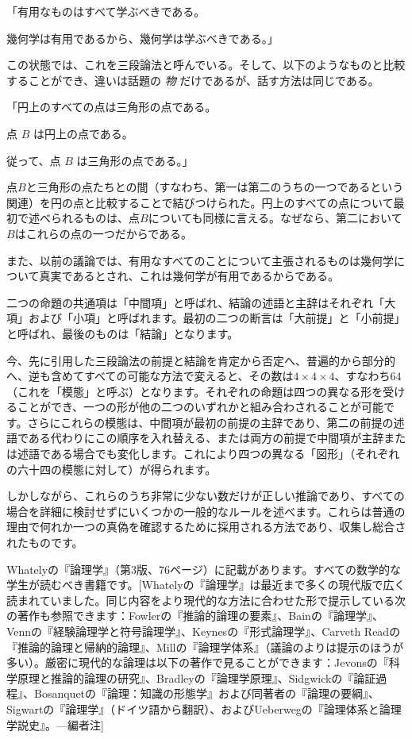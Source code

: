 \documentclass[a4paper,11pt,openany]{ltjsbook}
\begin{document}
「有用なものはすべて学ぶべきである。

幾何学は有用であるから、幾何学は学ぶべきである。」

この状態では、これを三段論法と呼んでいる。そして、以下のようなものと比較することができ、違いは話題の \emph{物} だけであるが、話す方法は同じである。

「円上のすべての点は三角形の点である。

点 $B$ は円上の点である。

従って、点 $B$ は三角形の点である。」

点$B$と三角形の点たちとの間（すなわち、第一は第二のうちの一つであるという関連）を円の点と比較することで結びつけられた。円上のすべての点について最初で述べられるものは、点$B$についても同様に言える。なぜなら、第二において$B$はこれらの点の一つだからである。

また、以前の議論では、有用なすべてのことについて主張されるものは幾何学について真実であるとされ、これは幾何学が有用であるからである。

二つの命題の共通項は「中間項」と呼ばれ、結論の述語と主辞はそれぞれ「大項」および「小項」と呼ばれます。最初の二つの断言は「大前提」と「小前提」と呼ばれ、最後のものは「結論」となります。

今、先に引用した三段論法の前提と結論を肯定から否定へ、普遍的から部分的へ、逆も含めてすべての可能な方法で変えると、その数は$4 \times 4 \times 4$、すなわち$64$（これを「模態」と呼ぶ）となります。それぞれの命題は四つの異なる形を受けることができ、一つの形が他の二つのいずれかと組み合わされることが可能です。さらにこれらの模態は、中間項が最初の前提の主辞であり、第二の前提の述語である代わりにこの順序を入れ替える、または両方の前提で中間項が主辞または述語である場合でも変化します。これにより四つの異なる「図形」（それぞれの六十四の模態に対して）が得られます。

しかしながら、これらのうち非常に少ない数だけが正しい推論であり、すべての場合を詳細に検討せずにいくつかの一般的なルールを述べます。これらは普通の理由で何れか一つの真偽を確認するために採用される方法であり、収集し総合されたものです。

Whatelyの『論理学』（第3版、76ページ）に記載があります。すべての数学的な学生が読むべき書籍です。[Whatelyの『論理学』は最近まで多くの現代版で広く読まれていました。同じ内容をより現代的な方法に合わせた形で提示している次の著作も参照できます：Fowlerの『推論的論理の要素』、Bainの『論理学』、Vennの『経験論理学と符号論理学』、Keynesの『形式論理学』、Carveth Readの『推論的論理と帰納的論理』、Millの『論理学体系』（議論のよりは提示のほうが多い）。厳密に現代的な論理は以下の著作で見ることができます：Jevonsの『科学原理と推論的論理の研究』、Bradleyの『論理学原理』、Sidgwickの『論証過程』、Bosanquetの『論理：知識の形態学』および同著者の『論理の要綱』、Sigwartの『論理学』（ドイツ語から翻訳）、およびUeberwegの『論理体系と論理学説史』。---編者注]
\end{document}
